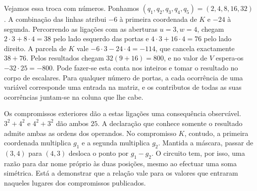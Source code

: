 Vejamos essa troca com números. Ponhamos
\((q_1,q_2,q_3,q_4,q_5)=(2,4,8,16,32)\). A combinação das linhas
atribui \(-6\) à primeira coordenada de \(K\) e \(-24\) à segunda.
Percorrendo as ligações com as aberturas \(u=3,w=4\), chegam
\(2\cdot3+8\cdot4=38\) pelo lado esquerdo das portas e
\(4\cdot3+16\cdot4=76\) pelo lado direito. A parcela de \(K\)
vale \(-6\cdot3-24\cdot4=-114\), que cancela exactamente
\(38+76\). Pelos resultados chegam \(32(9+16)=800\), e no valor
de \(V\) espera-os \(-32\cdot25=-800\). Pode fazer-se esta conta
nos inteiros e tomar o resultado no corpo de escalares. Para qualquer
número de portas, a cada ocorrência de uma
variável corresponde uma entrada na matriz, e os contributos de
todas as suas ocorrências juntam-se na coluna que lhe cabe.

Os compromissos exteriores dão a estas ligações uma consequência
observável. \(3^2+4^2\) e \(4^2+3^2\) dão ambos \(25\).
A declaração que conhece somente o resultado admite ambas as ordens
dos operandos. No compromisso \(K\), contudo, a primeira coordenada
multiplica \(g_1\) e a segunda multiplica \(g_2\). Mantida a
máscara, passar de \((3,4)\) para \((4,3)\) desloca o ponto por
\(g_1-g_2\). O circuito tem, por isso, uma razão para dar nome
próprio às duas posições, mesmo ao efectuar uma soma simétrica.
Está a demonstrar que a relação vale para os valores que entraram
naqueles lugares dos compromissos publicados.
